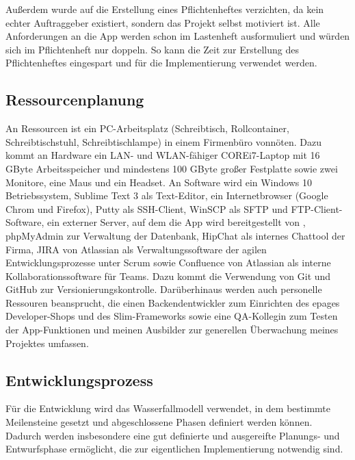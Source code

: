 Außerdem wurde auf die Erstellung eines Pflichtenheftes verzichten, da kein echter Auftraggeber existiert, sondern das Projekt selbst motiviert ist. Alle Anforderungen an die App werden schon im Lastenheft ausformuliert und würden sich im Pflichtenheft nur doppeln. So kann die Zeit zur Erstellung des Pflichtenheftes eingespart und für die Implementierung verwendet werden. 



\subsection{Ressourcenplanung}
\label{sec:Ressourcenplanung}

An Ressourcen ist ein PC-Arbeitsplatz (Schreibtisch, Rollcontainer, Schreibtischstuhl, Schreibtischlampe) in einem Firmenbüro vonnöten. Dazu kommt an Hardware ein LAN- und WLAN-fähiger COREi7-Laptop mit 16 GByte Arbeitsspeicher und mindestens 100 GByte großer Festplatte sowie zwei Monitore, eine Maus und ein Headset. An Software wird ein Windows 10 Betriebssystem, Sublime Text 3 als Text-Editor, ein Internetbrowser (Google Chrom und Firefox), Putty als \acs{SSH}-Client, Win\acs{SCP} als \acs{SFTP} und \acs{FTP}-Client-Software, ein externer Server, auf dem die App  wird bereitgestellt von , phpMyAdmin zur Verwaltung der Datenbank, HipChat als internes Chattool der Firma, JIRA von Atlassian als Verwaltungssoftware der agilen Entwicklungsprozesse unter Scrum sowie Confluence von Atlassian als interne Kollaborationssoftware für Teams. Dazu kommt die Verwendung von \acs{Git} und \acs{GitHub} zur Versionierungskontrolle. Darüberhinaus werden auch personelle Ressouren beansprucht, die einen Backendentwickler zum Einrichten des epages Developer-Shops und des Slim-Frameworks sowie eine \acs{QA}-Kollegin zum Testen der App-Funktionen und meinen Ausbilder zur generellen Überwachung meines Projektes umfassen.


\subsection{Entwicklungsprozess}
\label{sec:Entwicklungsprozess}

Für die Entwicklung wird das Wasserfallmodell verwendet, in dem bestimmte Meilensteine gesetzt und abgeschlossene Phasen definiert werden können. Dadurch werden insbesondere eine gut definierte und ausgereifte Planungs- und Entwurfsphase ermöglicht, die zur eigentlichen Implementierung notwendig sind. 
